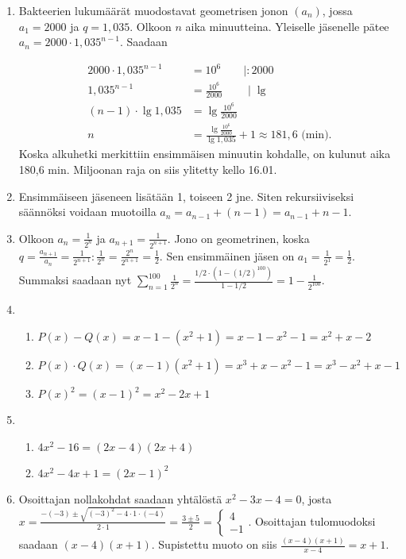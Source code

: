 \documentclass[12pt,fleqn]{article}
\begin{document}
\begin{enumerate}[label=\textbf{\arabic*.}]
\item Bakteerien lukumäärät muodostavat geometrisen jonon \((a_n)\), jossa \(a_1=2 000\) ja \(q=1,035\). Olkoon \(n\) aika minuutteina. Yleiselle jäsenelle pätee \(a_n=2 000\cdot 1,035^{n-1}\). Saadaan

\begin{align*}
    \displaystyle 
    2 000\cdot 1,035^{n-1}&=10^6 \qquad \mid :2000 \\
    1,035^{n-1}&=\frac{10^6}{2000} \qquad \mid \lg \\
    (n-1)\cdot \lg 1,035 &= \lg \frac{10^6}{2000} \\
    n&= \frac{\lg \frac{10^6}{2000}}{\lg 1,035}+1 \approx 181,6\text{ (min)}.
\end{align*}
Koska alkuhetki merkittiin ensimmäisen minuutin kohdalle, on kulunut aika 180,6 min. Miljoonan raja on siis ylitetty kello 16.01.

\item Ensimmäiseen jäseneen lisätään 1, toiseen 2 jne. Siten rekursiiviseksi säännöksi voidaan muotoilla \(a_n=a_{n-1}+(n-1)=a_{n-1}+n-1\).

\item Olkoon \(\displaystyle a_n=\frac{1}{2^n}\) ja \(\displaystyle a_{n+1}=\frac{1}{2^{n+1}}\). Jono on geometrinen, koska \(\displaystyle q=\frac{a_{n+1}}{a_n}=\frac{1}{2^{n+1}}:\frac{1}{2^n}=\frac{2^n}{2^{n+1}}=\frac{1}{2}\). Sen ensimmäinen jäsen on \(\displaystyle a_1=\frac{1}{2^1}=\frac{1}{2}\). Summaksi saadaan nyt \(\displaystyle \sum_{n=1}^{100} {\frac{1}{2^n}}=\frac{1/2 \cdot (1-(1/2)^{100})}{1-1/2}=1-\frac{1}{2^{100}}\).


\item 
\begin{enumerate}[label=\textbf{\alph*)}]
\item \(P(x)-Q(x)=x-1-(x^2+1)=x-1-x^2-1=x^2+x-2\)
\item \(P(x)\cdot Q(x)=(x-1)(x^2+1)=x^3+x-x^2-1=x^3-x^2+x-1\)
\item \(P(x)^2=(x-1)^2=x^2-2x+1\)
\end{enumerate}

\item 
\begin{enumerate}[label=\textbf{\alph*)}]
\item \(4x^2-16=(2x-4)(2x+4)\)
\item \(4x^2-4x+1=(2x-1)^2\)
\end{enumerate}

\item Osoittajan nollakohdat saadaan yhtälöstä \(x^2-3x-4=0\), josta \(\displaystyle x=\frac{-(-3) \pm \sqrt{(-3)^2-4\cdot 1\cdot (-4)}}{2\cdot 1}=\frac{3\pm 5}{2}=\begin{cases} 4 \\ -1 \end{cases}\). Osoittajan tulomuodoksi saadaan \((x-4)(x+1)\). Supistettu muoto on siis \(\displaystyle \frac{(x-4)(x+1)}{x-4}=x+1\).


\end{enumerate}
\end{document}
